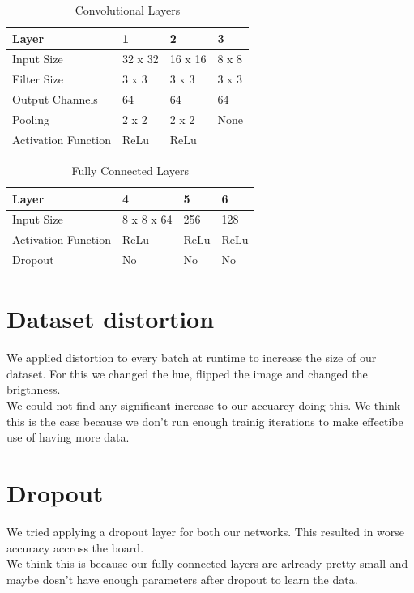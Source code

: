\documentclass[twoside, twocolumn]{article}
\begin{document}
\begin{table}[htb]
\label{table_conv}
	\caption{Convolutional Layers}
	\centering
		\begin{tabular}{l l l l}
			Layer & 1 & 2 & 3\\
			\midrule
			Input Size & 32 x 32 & 16 x 16  & 8 x 8\\
			Filter Size & 3 x 3 & 3 x 3 & 3 x 3\\
			Output Channels & 64 & 64 & 64\\
			Pooling & 2 x 2 & 2 x 2 & None\\
			Activation Function & ReLu & ReLu \\
\end{tabular}
\end{table}

\begin{table}[htb]
\label{table_fcl}
	\caption{Fully Connected Layers}
	\centering
		\begin{tabular}{l l l l}
			Layer & 4 & 5 & 6\\
			\midrule
			Input Size & 8 x 8 x 64 & 256 & 128 \\
			Activation Function & ReLu & ReLu & ReLu \\
			Dropout & No & No & No\\
\end{tabular}
\end{table}


\section{Dataset distortion}

We applied distortion to every batch at runtime to increase the size of our dataset. For this we changed the hue, flipped the image and changed the brigthness. \\
We could not find any significant increase to our accuarcy doing this.
We think this is the case because we don't run enough trainig iterations to make effectibe use of having more data.


\section{Dropout}

We tried applying a dropout layer for both our networks. This resulted in worse accuracy accross the board. \\
We think this is because our fully connected layers are arlready pretty small and maybe dosn't have enough parameters after dropout to learn the data.
\end{document}

